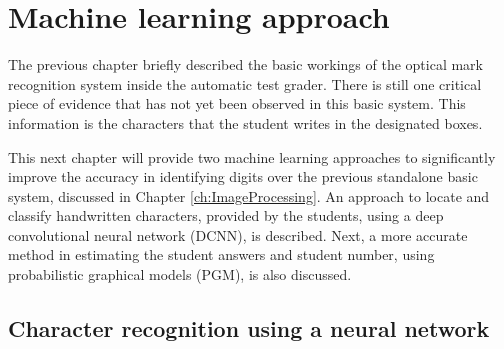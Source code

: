 \chapter{Machine learning approach}
\label{ch:MachineLearning}
\graphicspath{{Chapter4/Chapter4Figures/}}

The previous chapter briefly described the basic workings of the optical mark recognition system inside the automatic test grader. There is still one critical piece of evidence that has not yet been observed in this basic system. This information is the characters that the student writes in the designated boxes.

This next chapter will provide two machine learning approaches to significantly improve the accuracy in identifying digits over the previous standalone basic system, discussed in Chapter \ref{ch:ImageProcessing}. An approach to locate and classify handwritten characters, provided by the students, using a deep convolutional neural network (DCNN), is described. Next, a more accurate method in estimating the  student answers and student number, using probabilistic  graphical models (PGM), is also discussed. 

\section{Character recognition using a neural network}

